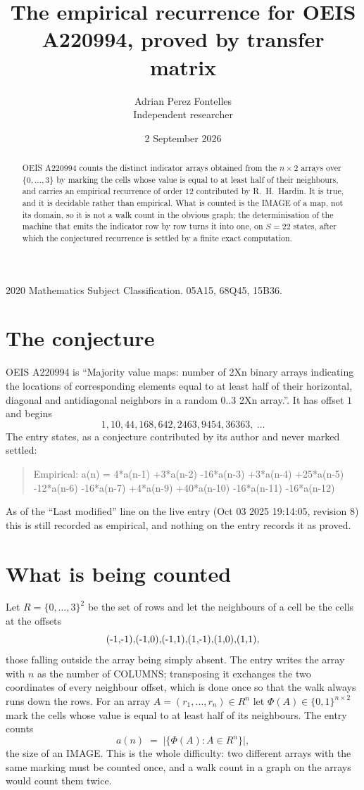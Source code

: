 \documentclass[11pt,a4paper]{article}
\title{The empirical recurrence for OEIS A220994, proved by transfer matrix}
\author{Adrian Perez Fontelles\\ \small Independent researcher}
\date{2 September 2026}
\theoremstyle{plain}
\theoremstyle{definition}
\begin{document}
\maketitle

\begin{abstract}
OEIS A220994 counts the distinct indicator arrays obtained from the $n\times2$ arrays over
$\{0,\dots,3\}$ by marking the cells whose value is equal to at least half of their neighbours, and carries an
empirical recurrence of order $12$ contributed by R.~H.~Hardin. It is true, and it is
decidable rather than empirical. What is counted is the IMAGE of a map, not its domain, so it
is not a walk count in the obvious graph; the determinisation of the machine that emits the
indicator row by row turns it into one, on $S=22$ states, after which the conjectured
recurrence is settled by a finite exact computation.
\end{abstract}

\noindent\small 2020 Mathematics Subject Classification. 05A15, 68Q45, 15B36.\normalsize

\section{The conjecture}

OEIS A220994 is ``Majority value maps: number of 2Xn binary arrays indicating the locations of corresponding elements equal to at least half of their horizontal, diagonal and antidiagonal neighbors in a random 0..3 2Xn array.''. It has offset $1$ and begins
\[
1, 10, 44, 168, 642, 2463, 9454, 36363,\ \dots
\]
The entry states, as a conjecture contributed by its author and never marked settled:
\begin{quote}
Empirical: a(n) = 4*a(n-1) +3*a(n-2) -16*a(n-3) +3*a(n-4) +25*a(n-5) -12*a(n-6) -16*a(n-7) +4*a(n-9) +40*a(n-10) -16*a(n-11) -16*a(n-12)
\end{quote}
As of the ``Last modified'' line on the live entry (Oct 03 2025 19:14:05, revision 8) this is still
recorded as empirical, and nothing on the entry records it as proved.

\section{What is being counted}

Let $R=\{0,\dots,3\}^{2}$ be the set of rows and let the neighbours of a cell be the
cells at the offsets
\[
$(-1,-1)$, $(-1,0)$, $(-1,1)$, $(1,-1)$, $(1,0)$, $(1,1)$,
\]
those falling outside the array being simply absent. The entry writes the array with $n$ as the number of COLUMNS; transposing it exchanges the two coordinates of every neighbour offset, which is done once so that the walk always runs down the rows. For an array
$A=(r_1,\dots,r_n)\in R^n$ let $\Phi(A)\in\{0,1\}^{n\times2}$ mark the cells whose value
is equal to at least half of its neighbours. The entry counts
\[
a(n)\;=\;\bigl|\{\Phi(A):A\in R^n\}\bigr| ,
\]
the size of an IMAGE. This is the whole difficulty: two different arrays with the same marking
must be counted once, and a walk count in a graph on the arrays would count them twice.
\end{document}
